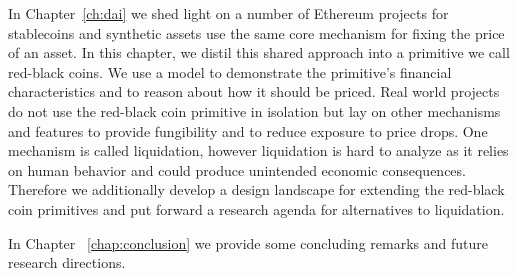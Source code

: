 In Chapter~\ref{ch:dai} we shed light on a number of Ethereum projects for stablecoins and synthetic assets use the same core mechanism for fixing the price of an asset. In this chapter, we distil this shared approach into a primitive we call red-black coins. We use a model to demonstrate the primitive's financial characteristics and to reason about how it should be priced. Real world projects do not use the red-black coin primitive in isolation but lay on other mechanisms and features to provide fungibility and to reduce exposure to price drops. One mechanism is called liquidation, however liquidation is hard to analyze as it relies on human behavior and could produce unintended economic consequences. Therefore we additionally develop a design landscape for extending the red-black coin primitives and put forward a research agenda for alternatives to liquidation.

In Chapter ~\ref{chap:conclusion} we provide some concluding remarks and future research directions.

